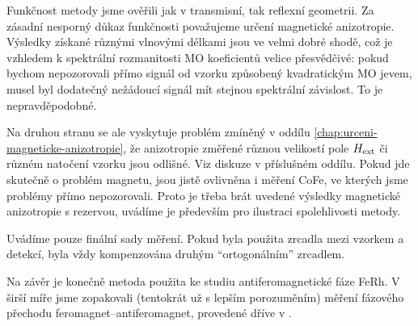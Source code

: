 Funkčnost metody jsme ověřili jak v transmisní, tak reflexní geometrii.
Za zásadní nesporný důkaz funkčnosti považujeme určení magnetické anizotropie.
Výsledky získané různými vlnovými délkami jsou ve velmi dobré shodě, což je vzhledem k spektrální rozmanitosti MO koeficientů velice přesvědčivé: pokud bychom nepozorovali přímo signál od vzorku způsobený kvadratickým MO jevem, musel byl dodatečný nežádoucí signál mít stejnou spektrální závislost.
To je nepravděpodobné.

Na druhou stranu se ale vyskytuje problém zmíněný v oddílu \ref{chap:urceni-magneticke-anizotropie}, že anizotropie změřené různou velikostí pole $H_\textrm{ext}$ či různém natočení vzorku jsou odlišné.
Viz diskuze v příslušném oddílu.
Pokud jde skutečně o problém magnetu, jsou jistě ovlivněna i měření CoFe, ve kterých jsme problémy přímo nepozorovali.
Proto je třeba brát uvedené výsledky magnetické anizotropie s rezervou, uvádíme je především pro ilustraci spolehlivosti metody.

Uvádíme pouze finální sady měření.
Pokud byla použita zrcadla mezi vzorkem a detekcí, byla vždy kompenzována druhým ``ortogonálním'' zrcadlem.

Na závěr je konečně metoda použita ke studiu antiferomagnetické fáze FeRh. 
V širší míře jsme zopakovali (tentokrát už s lepším porozuměním) měření fázového přechodu feromagnet--antiferomagnet, provedené dříve v \cite{kubascikMagnetooptickeStudiumAntiferomagnetickych2019}.
